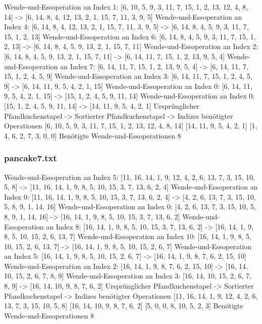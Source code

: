 {    Wende-und-Essoperation an Index 1: [6, 10, 5, 9, 3, 11, 7, 15, 1, 2, 13, 12, 4, 8, 14] -> [6, 14, 8, 4, 12, 13, 2, 1, 15, 7, 11, 3, 9, 5]
    Wende-und-Essoperation an Index 4: [6, 14, 8, 4, 12, 13, 2, 1, 15, 7, 11, 3, 9, 5] -> [6, 14, 8, 4, 5, 9, 3, 11, 7, 15, 1, 2, 13]
    Wende-und-Essoperation an Index 6: [6, 14, 8, 4, 5, 9, 3, 11, 7, 15, 1, 2, 13] -> [6, 14, 8, 4, 5, 9, 13, 2, 1, 15, 7, 11]
    Wende-und-Essoperation an Index 2: [6, 14, 8, 4, 5, 9, 13, 2, 1, 15, 7, 11] -> [6, 14, 11, 7, 15, 1, 2, 13, 9, 5, 4]
    Wende-und-Essoperation an Index 7: [6, 14, 11, 7, 15, 1, 2, 13, 9, 5, 4] -> [6, 14, 11, 7, 15, 1, 2, 4, 5, 9]
    Wende-und-Essoperation an Index 3: [6, 14, 11, 7, 15, 1, 2, 4, 5, 9] -> [6, 14, 11, 9, 5, 4, 2, 1, 15]
    Wende-und-Essoperation an Index 0: [6, 14, 11, 9, 5, 4, 2, 1, 15] -> [15, 1, 2, 4, 5, 9, 11, 14]
    Wende-und-Essoperation an Index 0: [15, 1, 2, 4, 5, 9, 11, 14] -> [14, 11, 9, 5, 4, 2, 1]
    Ursprünglicher Pfandkuchenstapel -> Sortierter Pfandkuchenstapel -> Indizes benötigter Operationen
    [6, 10, 5, 9, 3, 11, 7, 15, 1, 2, 13, 12, 4, 8, 14]
    [14, 11, 9, 5, 4, 2, 1]
    [1, 4, 6, 2, 7, 3, 0, 0]
    Benötigte Wende-und-Essoperationen 8
    \subsubsection{pancake7.txt}

    Wende-und-Essoperation an Index 5: [11, 16, 14, 1, 9, 12, 4, 2, 6, 13, 7, 3, 15, 10, 5, 8] -> [11, 16, 14, 1, 9, 8, 5, 10, 15, 3, 7, 13, 6, 2, 4]
    Wende-und-Essoperation an Index 0: [11, 16, 14, 1, 9, 8, 5, 10, 15, 3, 7, 13, 6, 2, 4] -> [4, 2, 6, 13, 7, 3, 15, 10, 5, 8, 9, 1, 14, 16]
    Wende-und-Essoperation an Index 0: [4, 2, 6, 13, 7, 3, 15, 10, 5, 8, 9, 1, 14, 16] -> [16, 14, 1, 9, 8, 5, 10, 15, 3, 7, 13, 6, 2]
    Wende-und-Essoperation an Index 8: [16, 14, 1, 9, 8, 5, 10, 15, 3, 7, 13, 6, 2] -> [16, 14, 1, 9, 8, 5, 10, 15, 2, 6, 13, 7]
    Wende-und-Essoperation an Index 10: [16, 14, 1, 9, 8, 5, 10, 15, 2, 6, 13, 7] -> [16, 14, 1, 9, 8, 5, 10, 15, 2, 6, 7]
    Wende-und-Essoperation an Index 5: [16, 14, 1, 9, 8, 5, 10, 15, 2, 6, 7] -> [16, 14, 1, 9, 8, 7, 6, 2, 15, 10]
    Wende-und-Essoperation an Index 2: [16, 14, 1, 9, 8, 7, 6, 2, 15, 10] -> [16, 14, 10, 15, 2, 6, 7, 8, 9]
    Wende-und-Essoperation an Index 3: [16, 14, 10, 15, 2, 6, 7, 8, 9] -> [16, 14, 10, 9, 8, 7, 6, 2]
    Ursprünglicher Pfandkuchenstapel -> Sortierter Pfandkuchenstapel -> Indizes benötigter Operationen
    [11, 16, 14, 1, 9, 12, 4, 2, 6, 13, 7, 3, 15, 10, 5, 8]
    [16, 14, 10, 9, 8, 7, 6, 2]
    [5, 0, 0, 8, 10, 5, 2, 3]
    Benötigte Wende-und-Essoperationen 8
}
